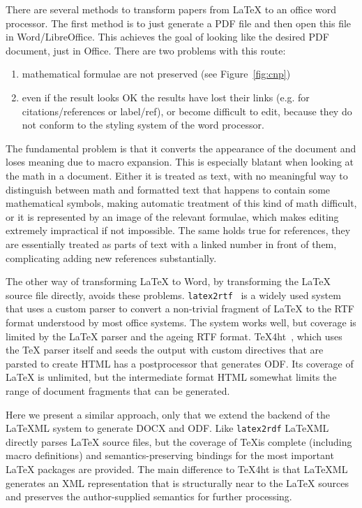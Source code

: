 \documentclass{llncs}
\def\latexml{{\LaTeX}ML\xspace}
\begin{document}
There are several methods to transform papers from {\LaTeX} to an office word
processor. The first method is to just generate a PDF file and then open this file in
Word/LibreOffice. This achieves the goal of looking like the desired PDF document, just in
Office. There are two problems with this route: 
\begin{enumerate}
\item mathematical formulae are not preserved (see Figure~\ref{fig:cnp})
\item even if the result looks OK the results have lost their links (e.g. for
  citations/references or label/ref), or become difficult to edit, because they do not
  conform to the styling system of the word processor.
\end{enumerate}
The fundamental problem is that it converts the appearance of the document and loses
meaning due to macro expansion. This is especially blatant when looking at the math in a
document. Either it is treated as text, with no meaningful way to distinguish between math
and formatted text that happens to contain some mathematical symbols, making automatic
treatment of this kind of math difficult, or it is represented by an image of the relevant
formulae, which makes editing extremely impractical if not impossible. The same holds true
for references, they are essentially treated as parts of text with a linked number in
front of them, complicating adding new references substantially.

The other way of transforming {\LaTeX} to Word, by transforming the {\LaTeX} source file
directly, avoids these problems. \texttt{latex2rtf}~\cite{latex2rtf:on} is a widely used
system that uses a custom parser to convert a non-trivial fragment of {\LaTeX} to the RTF
format understood by most office systems. The system works well, but coverage is limited
by the {\LaTeX} parser and the ageing RTF format.  TeX4ht~\cite{tex4ht:online}, which uses
the {\TeX} parser itself and seeds the output with custom directives that are parsted to
create HTML has a postprocessor that generates ODF. Its coverage of {\LaTeX} is unlimited,
but the intermediate format HTML somewhat limits the range of document fragments that can
be generated. 

Here we present a similar approach, only that we extend the backend of the \latexml system
to generate DOCX and ODF. Like \texttt{latex2rdf} \latexml directly parses {\LaTeX} source
files, but the coverage of \TeX is complete (including macro definitions) and
semantics-preserving bindings for the most important {\LaTeX} packages are provided. The
main difference to TeX4ht is that \latexml generates an XML representation that is
structurally near to the {\LaTeX} sources and preserves the author-supplied semantics for
further processing.
\end{document}
